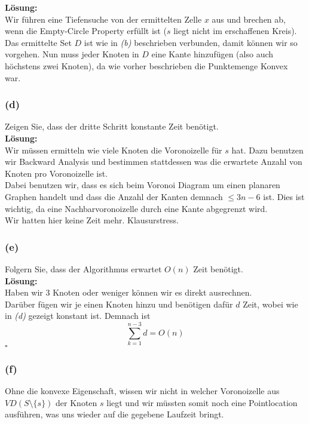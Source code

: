 \documentclass[11pt,a4paper,ngerman]{article}
\begin{document}
\textbf{Lösung:}\\

Wir führen eine Tiefensuche von der ermittelten Zelle $x$ aus und brechen ab, wenn die Empty-Circle Property erfüllt ist ($s$ liegt nicht im erschaffenen
Kreis). Das ermittelte Set $D$ ist wie in \emph{(b)} beschrieben verbunden, damit können wir so vorgehen. Nun muss jeder Knoten in
$D$ eine Kante hinzufügen (also auch höchstens zwei Knoten), da wie vorher beschrieben die Punktemenge Konvex war.

\subsubsection*{(d)}

Zeigen Sie, dass der dritte Schritt konstante Zeit benötigt.\\

\textbf{Lösung:}\\

Wir müssen ermitteln wie viele Knoten die Voronoizelle für $s$ hat. Dazu benutzen wir Backward Analysis und bestimmen
stattdessen was die erwartete Anzahl von Knoten pro Voronoizelle ist.\\

Dabei benutzen wir, dass es sich beim Voronoi Diagram um einen planaren Graphen handelt und dass die Anzahl
der Kanten demnach $\leq 3 n - 6$ ist. Dies ist wichtig, da eine Nachbarvoronoizelle durch eine Kante abgegrenzt wird.\\

Wir hatten hier keine Zeit mehr. Klausurstress.


\subsubsection*{(e)}

Folgern Sie, dass der Algorithmus erwartet $O(n)$ Zeit benötigt.\\

\textbf{Lösung:}\\

Haben wir $3$ Knoten oder weniger können wir es direkt ausrechnen.\\
Darüber fügen wir je einen Knoten hinzu und benötigen dafür $d$ Zeit, wobei wie in \emph{(d)} gezeigt konstant ist.
Demnach ist
$$
    \sum^{n-3}_{k=1} d = O(n)
$$
\mbox{} \hfill $\square$

\subsubsection*{(f)}

Ohne die konvexe Eigenschaft, wissen wir nicht in welcher Voronoizelle aus $VD(S \setminus \{s \})$ der Knoten $s$ liegt
und wir müssten somit noch eine Pointlocation ausführen, was uns wieder auf die gegebene Laufzeit bringt.

\label{LastPage}
\end{document}
